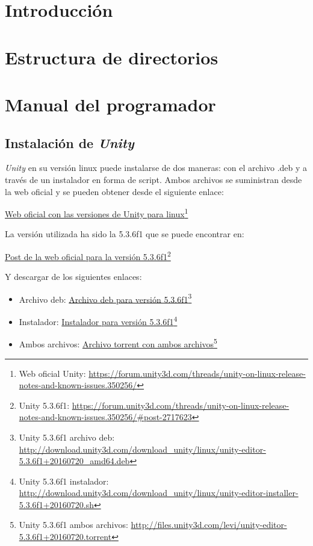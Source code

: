 
\section{Introducción}

\section{Estructura de directorios}

\section{Manual del programador}
\subsection{Instalación de \textit{Unity}}

\textit{Unity} \cite{unityweb} en su versión linux puede instalarse de dos maneras: con el archivo .deb y a través de un instalador en forma de script. Ambos archivos se suministran desde la web oficial y se pueden obtener desde el siguiente enlace:

\href{https://forum.unity3d.com/threads/unity-on-linux-release-notes-and-known-issues.350256/}{Web oficial con las versiones de Unity para linux}\footnote{Web oficial Unity: \url{https://forum.unity3d.com/threads/unity-on-linux-release-notes-and-known-issues.350256/}}

La versión utilizada ha sido la 5.3.6f1 que se puede encontrar en:

\href{https://forum.unity3d.com/threads/unity-on-linux-release-notes-and-known-issues.350256/#post-2717623}{Post de la web oficial para la versión 5.3.6f1}\footnote{Unity 5.3.6f1: \url{https://forum.unity3d.com/threads/unity-on-linux-release-notes-and-known-issues.350256/\#post-2717623}}

Y descargar de los siguientes enlaces:

\begin{itemize}
\item Archivo deb: \href{http://download.unity3d.com/download_unity/linux/unity-editor-5.3.6f1+20160720_amd64.deb}{Archivo deb para versión 5.3.6f1}\footnote{Unity 5.3.6f1 archivo deb: \url{http://download.unity3d.com/download_unity/linux/unity-editor-5.3.6f1+20160720_amd64.deb}}

\item Instalador: \href{http://download.unity3d.com/download_unity/linux/unity-editor-installer-5.3.6f1+20160720.sh}{Instalador para versión 5.3.6f1}\footnote{Unity 5.3.6f1 instalador: \url{http://download.unity3d.com/download_unity/linux/unity-editor-installer-5.3.6f1+20160720.sh}}

\item Ambos archivos: \href{http://files.unity3d.com/levi/unity-editor-5.3.6f1+20160720.torrent}{Archivo torrent con ambos archivos}\footnote{Unity 5.3.6f1 ambos archivos: \url{http://files.unity3d.com/levi/unity-editor-5.3.6f1+20160720.torrent}}
\end{itemize}

